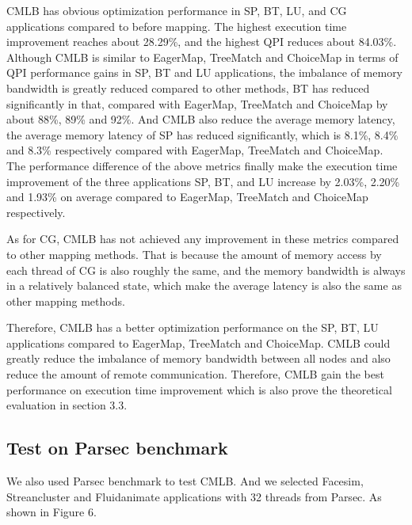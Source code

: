 \documentclass[a4paper,fleqn]{cas-sc}
\begin{document}
CMLB  has obvious optimization performance in SP, BT, LU, and CG applications compared to before mapping. The highest execution time improvement reaches about 28.29\%, and the highest QPI reduces about 84.03\%. Although CMLB is similar to EagerMap, TreeMatch and ChoiceMap in terms of QPI performance gains in SP, BT and LU applications, the imbalance of memory bandwidth is greatly reduced compared to other methods, BT has reduced significantly in that, compared with EagerMap, TreeMatch and ChoiceMap by about 88\%, 89\% and 92\%. And CMLB also reduce the average memory latency, the average memory latency of SP has reduced significantly, which is 8.1\%, 8.4\% and 8.3\% respectively compared with EagerMap, TreeMatch and ChoiceMap. The performance difference of the above metrics finally make the execution time improvement of the three applications SP, BT, and LU increase by 2.03\%, 2.20\% and 1.93\% on average compared to EagerMap, TreeMatch and ChoiceMap respectively.

As for CG, CMLB has not achieved any improvement in these metrics compared to other mapping methods. That is because the amount of memory access by each thread of CG is also roughly the same, and the memory bandwidth is always in a relatively balanced state, which make the average latency is also the same as other mapping methods.

Therefore, CMLB has a better optimization performance on the SP, BT, LU applications compared to EagerMap, TreeMatch and ChoiceMap. CMLB could greatly reduce the imbalance of memory bandwidth between all nodes and also reduce the amount of remote communication. Therefore, CMLB gain the best performance on execution time improvement which is also prove the theoretical evaluation in section 3.3.

\subsection{Test on Parsec benchmark }

We also used Parsec benchmark to test CMLB. And we selected Facesim, Streancluster and Fluidanimate applications with 32 threads from Parsec. As shown in Figure 6.
\end{document}
